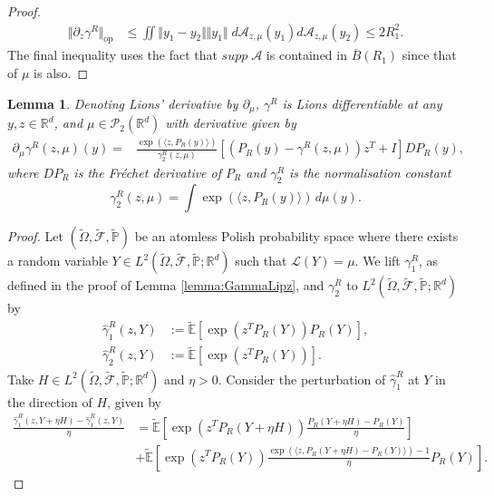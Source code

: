 \documentclass{article}
\newtheorem{lemma}[theorem]{Lemma}
\newcommand{\R}{\mathbb{R}}
\begin{document}
\begin{appendices}
\begin{proof}
\begin{align*}
    \Vert \partial_z\gamma^R\Vert_{\mathrm{op}}
    & \leq \iint \Vert y_1 -y_2\Vert \Vert y_1\Vert \; d\mathcal{A}_{z, \mu}(y_1)d\mathcal{A}_{z, \mu}(y_2)  \le 2R_1^2.
\end{align*}
The final inequality uses the fact that $supp \;\mathcal{A}$ is contained in $\bar B(R_1)$ since that of $\mu$ is also.
\end{proof}
\begin{lemma}
Denoting Lions' derivative by $\partial_{\mu}$, $\gamma^R$ is Lions differentiable at any $y,z\in \R^d$, and $\mu \in \mathcal{P}_2(\mathbb{R}^d)$ with derivative given by
    \begin{align*}
        \partial_{\mu} \gamma^R(z,\mu)(y) = &\frac{\exp(\langle z,P_R(y)\rangle)}{\gamma^R_{2}(z,\mu)} \left[(P_R(y)-\gamma^R(z,\mu))z^T+I \right]D P_R(y),
    \end{align*}
    where $DP_R$ is the Fr\'echet derivative of $P_R$ and $\gamma_2^R$ is the normalisation constant
    \begin{equation}\label{eqn:Z}
    \gamma_{2}^R(z,\mu) = \int \exp(\langle z, P_R(y)\rangle) \,d\mu(y).
\end{equation}
\end{lemma}
\begin{proof}
Let $(\widetilde{\Omega}, \widetilde{\mathcal{F}},\widetilde{\mathbb{P}})$ be an atomless Polish probability space where there exists a random variable $Y \in L^2(\widetilde{\Omega},\widetilde{\mathcal{F}},\widetilde{\mathbb{P}}; \mathbb{R}^d)$ such that $\mathcal{L}(Y) = \mu$. We lift $\gamma^R_{1}$, as defined in the proof of Lemma \ref{lemma:GammaLipz}, and $\gamma_{2}^R$ to $L^2(\widetilde{\Omega},\widetilde{\mathcal{F}},\widetilde{\mathbb{P}}; \mathbb{R}^d)$ by
\begin{align*}
    \hat{\gamma}_{1}^R(z,Y) &:= \widetilde{\mathbb{E}}[\exp(z^TP_R(Y))P_R(Y)],\\
  \hat \gamma_{2}^R(z,Y) &:= \widetilde{\mathbb{E}}[\exp(z^TP_R(Y))].
\end{align*}
Take $H \in L^2(\widetilde \Omega, \widetilde{\mathcal{F}}, \widetilde{\mathbb P};\R^d)$ and $\eta>0$. Consider the perturbation of $\hat \gamma_{1}^R$ at $Y$ in the direction of $H$, given by
\begin{align*}
    \frac{\hat\gamma_{1}^R(z,Y+\eta H)-\hat\gamma_{1}^R(z,Y)}{\eta}&= \widetilde{\mathbb{E}}\left[ \exp( z^TP_R(Y+\eta H) )\frac{P_R(Y+\eta H)-P_R(Y)}{\eta} \right]\\
    &+ \widetilde{\mathbb{E}} \left[ \exp( z^TP_R(Y))\frac{\exp(\langle z,P_R(Y+\eta H)-P_R(Y)\rangle)-1}{\eta}P_R(Y)\right].

\end{align*}
\end{proof}
\end{appendices}
\end{document}

